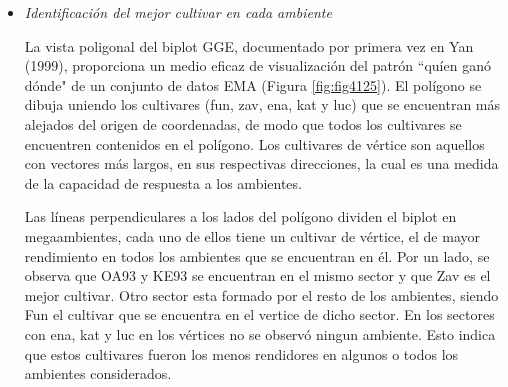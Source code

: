 \begin{itemize}[wide, nosep, labelindent = 0pt, topsep = 1ex, noitemsep,topsep=0pt]


\item \emph{Identificación del mejor cultivar en cada ambiente}

La vista poligonal del biplot GGE, documentado por primera vez en Yan (1999), proporciona un medio eficaz de visualización del patrón ``quíen ganó dónde" de un conjunto de datos EMA (Figura \ref{fig:fig4125}). 
El polígono se dibuja uniendo los cultivares (fun, zav, ena, kat y luc) que se encuentran más alejados del origen de coordenadas, de modo que todos los cultivares se encuentren contenidos en el polígono. Los cultivares de vértice son aquellos con  vectores más largos, en sus respectivas direcciones, la cual es una medida de la capacidad de respuesta a los ambientes. 

Las líneas perpendiculares a los lados del polígono dividen el biplot en megaambientes, cada uno de ellos tiene un cultivar de vértice, el de mayor rendimiento en todos los ambientes que se encuentran en él. Por un lado, se observa que OA93 y KE93 se encuentran en el mismo sector y que Zav es el mejor cultivar. Otro sector esta formado por el resto de los ambientes, siendo Fun el cultivar que se encuentra en el vertice de dicho sector. En los sectores con ena, kat y luc en los vértices no se observó ningun ambiente. Esto indica que estos cultivares fueron los menos rendidores en algunos o todos los ambientes considerados.


\end{itemize}
